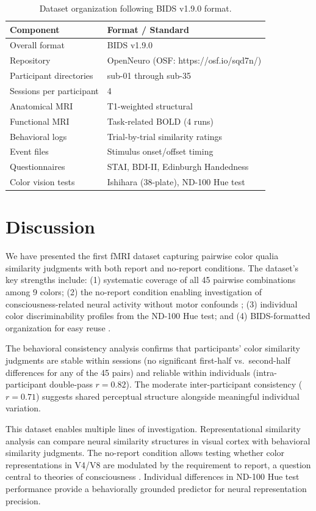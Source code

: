 \documentclass[11pt]{article}
\begin{document}
\begin{table}[H]
\centering
\caption{Dataset organization following BIDS v1.9.0 format.}
\label{tab:bids}
\begin{tabular}{ll}
\toprule
\textbf{Component} & \textbf{Format / Standard} \\
\midrule
Overall format & BIDS v1.9.0 \\
Repository & OpenNeuro (OSF: https://osf.io/sqd7n/) \\
Participant directories & sub-01 through sub-35 \\
Sessions per participant & 4 \\
Anatomical MRI & T1-weighted structural \\
Functional MRI & Task-related BOLD (4 runs) \\
Behavioral logs & Trial-by-trial similarity ratings \\
Event files & Stimulus onset/offset timing \\
Questionnaires & STAI, BDI-II, Edinburgh Handedness \\
Color vision tests & Ishihara (38-plate), ND-100 Hue test \\
\bottomrule
\end{tabular}
\end{table}

\section{Discussion}

We have presented the first fMRI dataset capturing pairwise color qualia similarity judgments with both report and no-report conditions. The dataset's key strengths include: (1) systematic coverage of all 45 pairwise combinations among 9 colors; (2) the no-report condition enabling investigation of consciousness-related neural activity without motor confounds \citep{tsuchiya2015}; (3) individual color discriminability profiles from the ND-100 Hue test; and (4) BIDS-formatted organization for easy reuse \citep{gorgolewski2016}.

The behavioral consistency analysis confirms that participants' color similarity judgments are stable within sessions (no significant first-half vs.\ second-half differences for any of the 45 pairs) and reliable within individuals (intra-participant double-pass $r = 0.82$). The moderate inter-participant consistency ($r = 0.71$) suggests shared perceptual structure alongside meaningful individual variation.

This dataset enables multiple lines of investigation. Representational similarity analysis \citep{kriegeskorte2008} can compare neural similarity structures in visual cortex with behavioral similarity judgments. The no-report condition allows testing whether color representations in V4/V8 \citep{bartels2000, brouwer2009} are modulated by the requirement to report, a question central to theories of consciousness \citep{koch2016, dehaene2011}. Individual differences in ND-100 Hue test performance provide a behaviorally grounded predictor for neural representation precision.
\end{document}

